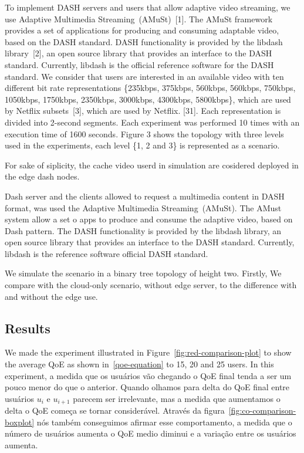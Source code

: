To implement DASH servers and users that allow adaptive video streaming, we use Adaptive Multimedia Streaming~(AMuSt)~[1]. The AMuSt framework provides a set of applications for producing and consuming adaptable video, based on the DASH standard. DASH functionality is provided by the libdash library~[2], an open source library that provides an interface to the DASH standard. Currently, libdash is the official reference software for the DASH standard. We consider that users are interested in an available video with ten different bit rate representations \{235kbps, 375kbps, 560kbps, 560kbps, 750kbps, 1050kbps, 1750kbps, 2350kbps, 3000kbps, 4300kbps, 5800kbps\}, which are used by Netflix subsets~[3], which are used by Netflix. [31]. Each representation is divided into 2-second segments. Each experiment was performed 10 times with an execution time of 1600 seconds. Figure 3 shows the topology with three levels used in the experiments, each level \{1, 2 and 3\} is represented as a scenario.


For sake of siplicity, the cache video userd in simulation are cosidered deployed in the edge dash nodes. 

Dash server and the clients allowed to request a multimedia content in DASH format, was used the Adaptive Multimedia Streaming~(AMuSt). The AMust system allow a set o apps to produce and consume the adaptive video, based on Dash pattern. The DASH functionality is provided by the libdash library, an open source library that provides an interface to the DASH standard. Currently, libdash is the reference software official DASH standard.

We simulate the scenario in a binary tree topology of height two.  Firstly, We compare with the cloud-only scenario, without edge server, to the difference with and without the edge use. 




\subsection{Results}

We made the experiment illustrated in Figure~\ref{fig:red-comparison-plot} to show the average QoE as shown in~\ref{qoe-equation} to 15, 20 and 25 users. In this experiment, a medida que os usuários vão chegando o QoE final tenda a ser um pouco menor do que o anterior. Quando olhamos para delta do QoE final entre usuários $u_{i}$ e $u_{i+1}$ parecem ser irrelevante, mas a medida que aumentamos o delta o QoE começa se tornar considerável. Através da figura~\ref{fig:co-comparison-boxplot} nós também conseguimos afirmar esse comportamento, a medida que o número de usuários aumenta o QoE medio diminui e a variação entre os usuários aumenta. 

